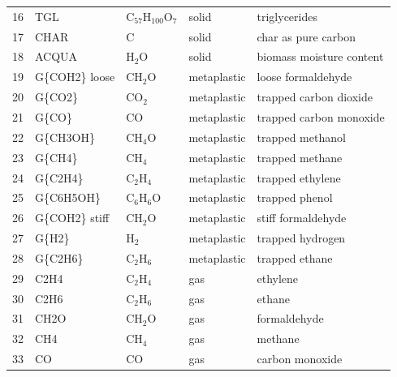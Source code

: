 \documentclass[12pt,titlepage]{article}
\begin{document}
\begin{center}
\begin{longtable}{cllll}
    16 & TGL            & C$_{57}$H$_{100}$O$_7$  & \cellcolor{green!25}solid        & triglycerides \\
    17 & CHAR           & C                       & \cellcolor{green!25}solid        & char as pure carbon \\
    18 & ACQUA          & H$_2$O                  & \cellcolor{green!25}solid        & biomass moisture content \\
    19 & G\{COH2\} loose& CH$_2$O                 & \cellcolor{orange!25}metaplastic & loose formaldehyde \\
    20 & G\{CO2\}       & CO$_2$                  & \cellcolor{orange!25}metaplastic & trapped carbon dioxide \\
    21 & G\{CO\}        & CO                      & \cellcolor{orange!25}metaplastic & trapped carbon monoxide \\
    22 & G\{CH3OH\}     & CH$_4$O                 & \cellcolor{orange!25}metaplastic & trapped methanol \\
    23 & G\{CH4\}       & CH$_4$                  & \cellcolor{orange!25}metaplastic & trapped methane \\
    24 & G\{C2H4\}      & C$_2$H$_4$              & \cellcolor{orange!25}metaplastic & trapped ethylene \\
    25 & G\{C6H5OH\}    & C$_6$H$_6$O             & \cellcolor{orange!25}metaplastic & trapped phenol \\
    26 & G\{COH2\} stiff& CH$_2$O                 & \cellcolor{orange!25}metaplastic & stiff formaldehyde \\
    27 & G\{H2\}        & H$_2$                   & \cellcolor{orange!25}metaplastic & trapped hydrogen \\
    28 & G\{C2H6\}      & C$_2$H$_6$              & \cellcolor{orange!25}metaplastic & trapped ethane \\
    29 & C2H4           & C$_2$H$_4$              & \cellcolor{purple!25}gas         & ethylene \\
    30 & C2H6           & C$_2$H$_6$              & \cellcolor{purple!25}gas         & ethane \\
    31 & CH2O           & CH$_2$O                 & \cellcolor{purple!25}gas         & formaldehyde \\
    32 & CH4            & CH$_4$                  & \cellcolor{purple!25}gas         & methane \\
    33 & CO             & CO                      & \cellcolor{purple!25}gas         & carbon monoxide \\

\end{longtable}
\end{center}
\end{document}
